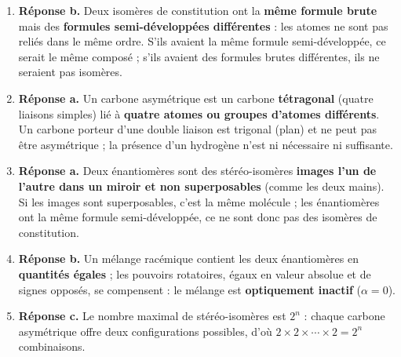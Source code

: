 \documentclass[11pt]{article}
\begin{document}
\begin{corrige}
\begin{enumerate}
\item \textbf{Réponse b.} Deux isomères de constitution ont la \textbf{même formule brute} mais des \textbf{formules semi-développées différentes} : les atomes ne sont pas reliés dans le même ordre. S'ils avaient la même formule semi-développée, ce serait le même composé ; s'ils avaient des formules brutes différentes, ils ne seraient pas isomères.
\item \textbf{Réponse a.} Un carbone asymétrique est un carbone \textbf{tétragonal} (quatre liaisons simples) lié à \textbf{quatre atomes ou groupes d'atomes différents}. Un carbone porteur d'une double liaison est trigonal (plan) et ne peut pas être asymétrique ; la présence d'un hydrogène n'est ni nécessaire ni suffisante.
\item \textbf{Réponse a.} Deux énantiomères sont des stéréo-isomères \textbf{images l'un de l'autre dans un miroir et non superposables} (comme les deux mains). Si les images sont superposables, c'est la même molécule ; les énantiomères ont la même formule semi-développée, ce ne sont donc pas des isomères de constitution.
\item \textbf{Réponse b.} Un mélange racémique contient les deux énantiomères en \textbf{quantités égales} ; les pouvoirs rotatoires, égaux en valeur absolue et de signes opposés, se compensent : le mélange est \textbf{optiquement inactif} ($\alpha = 0$).
\item \textbf{Réponse c.} Le nombre maximal de stéréo-isomères est $2^n$ : chaque carbone asymétrique offre deux configurations possibles, d'où $2 \times 2 \times \cdots \times 2 = 2^n$ combinaisons.
\end{enumerate}
\end{corrige}
\end{document}
